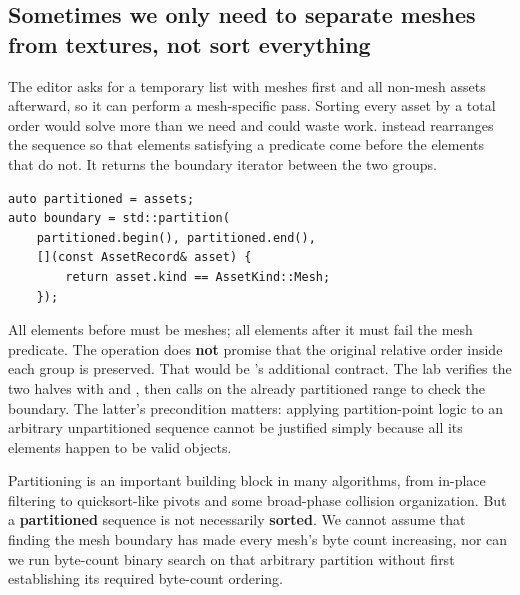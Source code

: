 \subsection{Sometimes we only need to separate meshes from textures, not sort everything}\label{01-foundations-i-ch006-sometimes-we-only-need-to-separate-meshes-from-textures-not-sort-everything}

\hypertarget{01-foundations-i-ch006-sometimes-we-only-need-to-separate-meshes-from-textures-not-sort-everything}{}

The editor asks for a temporary list with meshes first and all non-mesh assets afterward, so it can perform a mesh-specific pass. Sorting every asset by a total order would solve more than we need and could waste work.  instead rearranges the sequence so that elements satisfying a predicate come before the elements that do not. It returns the boundary iterator between the two groups.

\begin{verbatim}
auto partitioned = assets;
auto boundary = std::partition(
    partitioned.begin(), partitioned.end(),
    [](const AssetRecord& asset) {
        return asset.kind == AssetKind::Mesh;
    });
\end{verbatim}

All elements before  must be meshes; all elements after it must fail the mesh predicate. The operation does \textbf{not} promise that the original relative order inside each group is preserved. That would be 's additional contract. The lab verifies the two halves with  and , then calls  on the already partitioned range to check the boundary. The latter's precondition matters: applying partition-point logic to an arbitrary unpartitioned sequence cannot be justified simply because all its elements happen to be valid objects.

Partitioning is an important building block in many algorithms, from in-place filtering to quicksort-like pivots and some broad-phase collision organization. But a \textbf{partitioned} sequence is not necessarily \textbf{sorted}. We cannot assume that finding the mesh boundary has made every mesh's byte count increasing, nor can we run byte-count binary search on that arbitrary partition without first establishing its required byte-count ordering.

